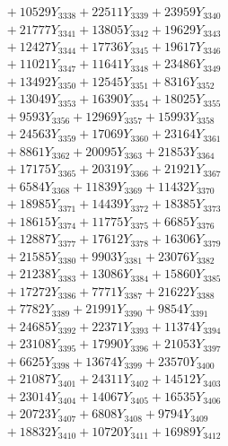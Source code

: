 \documentclass[a4paper,10pt]{article}
\begin{document}
{\begin{align}
&\;  + 10529 Y_{3338} + 22511 Y_{3339} + 23959 Y_{3340} \\[0.3ex]
&\;  + 21777 Y_{3341} + 13805 Y_{3342} + 19629 Y_{3343} \\[0.3ex]
&\;  + 12427 Y_{3344} + 17736 Y_{3345} + 19617 Y_{3346} \\[0.3ex]
&\;  + 11021 Y_{3347} + 11641 Y_{3348} + 23486 Y_{3349} \\[0.3ex]
&\;  + 13492 Y_{3350} + 12545 Y_{3351} + 8316 Y_{3352} \\[0.3ex]
&\;  + 13049 Y_{3353} + 16390 Y_{3354} + 18025 Y_{3355} \\[0.3ex]
&\;  + 9593 Y_{3356} + 12969 Y_{3357} + 15993 Y_{3358} \\[0.5ex]\allowbreak
&\;  + 24563 Y_{3359} + 17069 Y_{3360} + 23164 Y_{3361} \\[0.3ex]
&\;  + 8861 Y_{3362} + 20095 Y_{3363} + 21853 Y_{3364} \\[0.3ex]
&\;  + 17175 Y_{3365} + 20319 Y_{3366} + 21921 Y_{3367} \\[0.3ex]
&\;  + 6584 Y_{3368} + 11839 Y_{3369} + 11432 Y_{3370} \\[0.3ex]
&\;  + 18985 Y_{3371} + 14439 Y_{3372} + 18385 Y_{3373} \\[0.3ex]
&\;  + 18615 Y_{3374} + 11775 Y_{3375} + 6685 Y_{3376} \\[0.3ex]
&\;  + 12887 Y_{3377} + 17612 Y_{3378} + 16306 Y_{3379} \\[0.3ex]
&\;  + 21585 Y_{3380} + 9903 Y_{3381} + 23076 Y_{3382} \\[0.3ex]
&\;  + 21238 Y_{3383} + 13086 Y_{3384} + 15860 Y_{3385} \\[0.3ex]
&\;  + 17272 Y_{3386} + 7771 Y_{3387} + 21622 Y_{3388} \\[0.5ex]\allowbreak
&\;  + 7782 Y_{3389} + 21991 Y_{3390} + 9854 Y_{3391} \\[0.3ex]
&\;  + 24685 Y_{3392} + 22371 Y_{3393} + 11374 Y_{3394} \\[0.3ex]
&\;  + 23108 Y_{3395} + 17990 Y_{3396} + 21053 Y_{3397} \\[0.3ex]
&\;  + 6625 Y_{3398} + 13674 Y_{3399} + 23570 Y_{3400} \\[0.3ex]
&\;  + 21087 Y_{3401} + 24311 Y_{3402} + 14512 Y_{3403} \\[0.3ex]
&\;  + 23014 Y_{3404} + 14067 Y_{3405} + 16535 Y_{3406} \\[0.3ex]
&\;  + 20723 Y_{3407} + 6808 Y_{3408} + 9794 Y_{3409} \\[0.3ex]
&\;  + 18832 Y_{3410} + 10720 Y_{3411} + 16989 Y_{3412} \\[0.3ex]

\end{align}}
\end{document}
